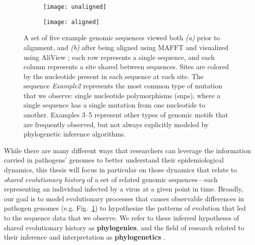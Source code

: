 \begin{figure}[ht]
  \centering
  \begin{subfigure}{0.95\textwidth}
    \texttt{[image: unaligned]}
    \caption{}
  \end{subfigure}
  \begin{subfigure}{0.95\textwidth}
    \texttt{[image: aligned]}
    \caption{}
  \end{subfigure}
  \caption[Multiple sequence alignment]{A set of five example genomic sequences viewed both \textit{(a)} prior to alignment, and \textit{(b)} after being aligned using MAFFT \citep{katoh2013mafft} and visualized using AliView \citep{larsson2014aliview}; each row represents a single sequence, and each column represents a site shared between sequences. Sites are colored by the nucleotide present in each sequence at each site. The sequence \textit{Example2} represents the most common type of mutation that we observe: single nucleotide polymorphisms (\gls{snp}s), where a single sequence has a single mutation from one nucleotide to another. Examples 3--5 represent other types of genomic motifs that are frequently observed, but not always explicitly modeled by phylogenetic inference algorithms.}
  \label{fig:alignment}
\end{figure}

While there are many different ways that researchers can leverage the information carried in pathogens' genomes to better understand their epidemiological dynamics, this thesis will focus in particular on those dynamics that relate to \textit{shared evolutionary history} of a set of related genomic sequences---each representing an individual infected by a virus at a given point in time.
Broadly, our goal is to model evolutionary processes that causes observable differences in pathogen genomes (e.g. Fig.~\ref{fig:alignment}) to hypothesize the patterns of evolution that led to the sequence data that we observe.
We refer to these inferred hypotheses of shared evolutionary history as \textbf{phylogenies}, and the field of research related to their inference and interpretation as \textbf{phylogenetics} \citep{felsenstein2003inferring}.


